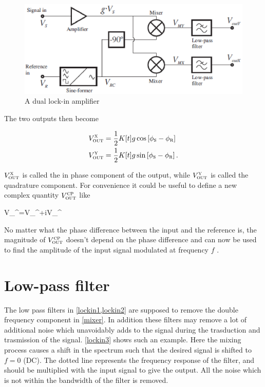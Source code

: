 \begin{figure}[!hbt]\centering
\includegraphics[width=\linewidth, draft=\foto]{eps/lockin2.eps}
\caption{A dual lock-in amplifier}
\label{lockin2}
\end{figure}

The two outputs then become

\begin{align}
V_{\mbox{\footnotesize{\scshape{out}}}}^{\mbox{\footnotesize{\scshape{x}}}}&=\frac{1}{2} K[t] g\cos\left[\phi_{\mbox{\footnotesize{\scshape{s}}}}-\phi_{\mbox{\footnotesize{\scshape{r}}}}\right]
\\
V_{\mbox{\footnotesize{\scshape{out}}}}^{\mbox{\footnotesize{\scshape{y}}}}&=\frac{1}{2} K[t] g\sin\left[\phi_{\mbox{\footnotesize{\scshape{s}}}}-\phi_{\mbox{\footnotesize{\scshape{r}}}}\right].
\end{align}

$V_{\mbox{\footnotesize{\scshape{out}}}}^{\mbox{\footnotesize{\scshape{x}}}}$ is called the in phase component of the output, while $V_{\mbox{\footnotesize{\scshape{out}}}}^{\mbox{\footnotesize{\scshape{y}}}}$ is called the quadrature component. For convenience it could be useful to define a new complex quantity $V_{\mbox{\footnotesize{\scshape{out}}}}^{\mbox{\footnotesize{\scshape{cp}}}}$ like

\mate
V_{}^{}=V_{}^{}+iV_{}^{}
\atem

No matter what the phase difference between the input and the reference is, the magnitude of $V_{\mbox{\footnotesize{\scshape{out}}}}^{\mbox{\footnotesize{\scshape{cp}}}}$ doesn't depend on the phase difference and can now be used to find the amplitude of the input signal modulated at frequency $f$ .

	\section{Low-pass filter}

The low pass filters in \cref{lockin1,lockin2} are supposed to remove the double frequency component in \cref{mixer}. In addition these filters may remove a lot of additional noise which unavoidably adds to the signal during the trasduction and trasmission of the signal. \cref{lockin3} shows such an example. Here the mixing process causes a shift in the spectrum such that the desired signal is shifted to $f=0$ (DC). The dotted line represents the frequency response of the filter, and should be multiplied with the input signal to give the output. All the noise which is not within the bandwidth of the filter is removed.

